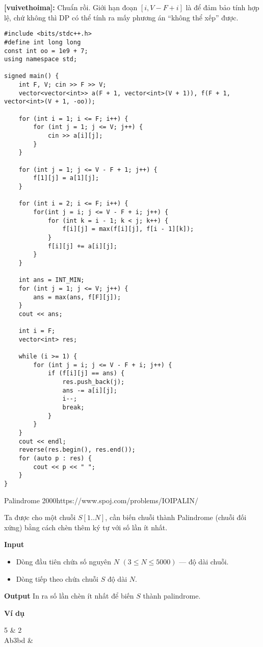\textbf{[vuivethoima]:} Chuẩn rồi. Giới hạn đoạn $[i, V-F+i]$ là để đảm bảo tính hợp lệ, chứ không thì DP có thể tính ra mấy phương án ``không thể xếp'' được.\\

\begin{lstlisting}[title=\centering \textbf{Cài đặt}]
#include <bits/stdc++.h>
#define int long long
const int oo = 1e9 + 7;
using namespace std;

signed main() {
    int F, V; cin >> F >> V;
    vector<vector<int>> a(F + 1, vector<int>(V + 1)), f(F + 1, vector<int>(V + 1, -oo));

    for (int i = 1; i <= F; i++) {
        for (int j = 1; j <= V; j++) {
            cin >> a[i][j];
        }
    }

    for (int j = 1; j <= V - F + 1; j++) {
        f[1][j] = a[1][j];
    }

    for (int i = 2; i <= F; i++) {
        for(int j = i; j <= V - F + i; j++) {
            for (int k = i - 1; k < j; k++) {
                f[i][j] = max(f[i][j], f[i - 1][k]);
            }
            f[i][j] += a[i][j];
        }
    }

    int ans = INT_MIN;
    for (int j = 1; j <= V; j++) {
        ans = max(ans, f[F][j]);
    }
    cout << ans;

    int i = F;
    vector<int> res;

    while (i >= 1) {
        for (int j = i; j <= V - F + i; j++) {
            if (f[i][j] == ans) {
                res.push_back(j);
                ans -= a[i][j];
                i--;
                break;
            }
        }
    }
    cout << endl;
    reverse(res.begin(), res.end());
    for (auto p : res) {
        cout << p << " ";
    }
}
\end{lstlisting}

\begin{baitap}{Palindrome 2000}{https://www.spoj.com/problems/IOIPALIN/}

Ta được cho một chuỗi $S[1..N]$, cần biến chuỗi thành Palindrome (chuỗi đối xứng) bằng cách chèn thêm ký tự với số lần ít nhất.

\textbf{Input}
\begin{itemize}[noitemsep]
    \item Dòng đầu tiên chứa số nguyên $N$ $(3 \leq N \leq 5000)$ — độ dài chuỗi.
    \item Dòng tiếp theo chứa chuỗi $S$ độ dài $N$.
\end{itemize}

\textbf{Output}  
In ra số lần chèn ít nhất để biến $S$ thành palindrome.

\textbf{Ví dụ}

\begin{sampleio}
5 & 2 \\
Ab3bd & \\
\end{sampleio}
\end{baitap}

